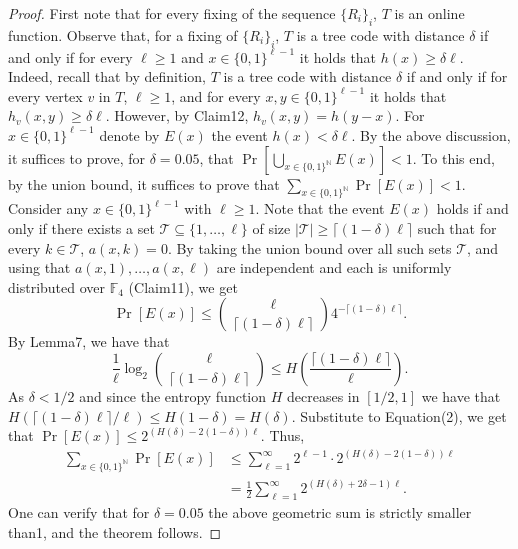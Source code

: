 \begin{proof}
First note that for every fixing of the sequence $\{R_i\}_i$, $T$ is an online function. Observe that, for a fixing of $\{R_i\}_i$, $T$ is a tree code with distance $\delta$ if and only if for every $\ell\ge1$ and $x\in\{0,1\}^{\ell-1}$ it holds that $h(x)\ge\delta\ell$. Indeed, recall that by definition, $T$ is a tree code with distance $\delta$ if and only if for every vertex $v$ in $T$, $\ell\ge1$, and for every $x,y\in\{0,1\}^{\ell-1}$ it holds that $h_v(x,y)\ge\delta\ell$. However, by Claim12, $h_v(x,y)=h(y-x)$.
For $x\in\{0,1\}^{\ell-1}$ denote by $E(x)$ the event $h(x)<\delta\ell$. By the above discussion, it suffices to prove, for $\delta=0.05$, that $\Pr[\bigcup_{x\in\{0,1\}^{\mathbb N}}E(x)]<1$. To this end, by the union bound, it suffices to prove that $\sum_{x\in\{0,1\}^{\mathbb N}}\Pr[E(x)]<1$.
Consider any $x\in\{0,1\}^{\ell-1}$ with $\ell\ge1$. Note that the event $E(x)$ holds if and only if there exists a set $\mathcal T\subseteq\{1,\ldots,\ell\}$ of size $|\mathcal T|\ge\lceil(1-\delta)\ell\rceil$ such that for every $k\in\mathcal T$, $a(x,k)=0$. By taking the union bound over all such sets $\mathcal T$, and using that $a(x,1),\ldots,a(x,\ell)$ are independent and each is uniformly distributed over $\mathbb F_4$ (Claim11), we get
\begin{equation}
\Pr[E(x)]\le\binom\ell{\lceil(1-\delta)\ell\rceil}4^{-\lceil(1-\delta)\ell\rceil}.\tag{2}
\end{equation}
By Lemma7, we have that
\[
\frac1\ell\log_2\binom\ell{\lceil(1-\delta)\ell\rceil}
\le H\left(\frac{\lceil(1-\delta)\ell\rceil}{\ell}\right).
\]
As $\delta<1/2$ and since the entropy function $H$ decreases in $[1/2,1]$ we have that
$H(\lceil(1-\delta)\ell\rceil/\ell)\le H(1-\delta)=H(\delta)$.
Substitute to Equation(2), we get that $\Pr[E(x)]\le2^{(H(\delta)-2(1-\delta))\ell}$. Thus,
\begin{align*}
\sum_{x\in\{0,1\}^{\mathbb N}}\Pr[E(x)]
&\le\sum_{\ell=1}^\infty2^{\ell-1}\cdot2^{(H(\delta)-2(1-\delta))\ell}\\
&=\frac12\sum_{\ell=1}^\infty2^{(H(\delta)+2\delta-1)\ell}.
\end{align*}
One can verify that for $\delta=0.05$ the above geometric sum is strictly smaller than1, and the theorem follows.
\end{proof}
